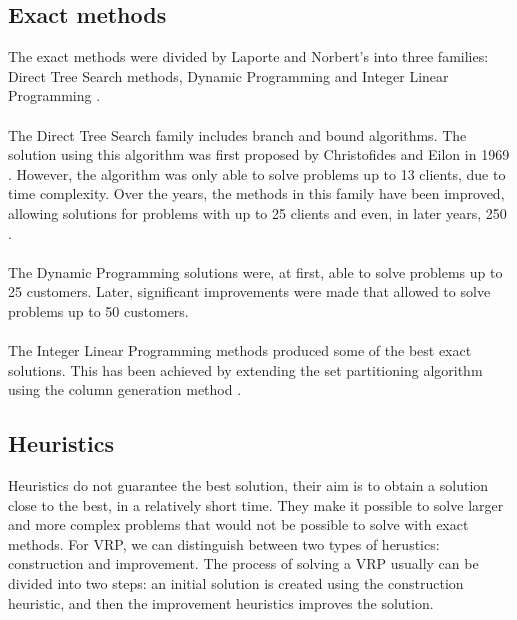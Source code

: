 \documentclass[a4paper,twoside,12pt]{book}
\begin{document}
\subsection{Exact methods}
The exact methods were divided by Laporte and Norbert's into three families: Direct Tree Search methods, Dynamic Programming and Integer Linear Programming \cite{bib:chapter:ExactMethods}.
\paragraph{}
The Direct Tree Search family includes branch and bound algorithms. The solution using this algorithm was first proposed by Christofides and Eilon in 1969 \cite{bib:article:Eilon}. However, the algorithm was only able to solve problems up to 13 clients, due to time complexity. Over the years, the methods in this family have been improved, allowing solutions for problems with up to 25 \cite{bib:article:LowerBound} clients and even, in later years, 250 \cite{bib:article:Laporte}.
\paragraph{}
The Dynamic Programming solutions were, at first, able to solve problems up to 25 customers. Later, significant improvements were made that allowed to solve problems up to 50 customers.
\paragraph{}
The Integer Linear Programming methods produced some of the best exact solutions. This has been achieved by extending the set partitioning algorithm using the column generation method \cite{bib:article:ILP}. 

\subsection{Heuristics}
Heuristics do not guarantee the best solution, their aim is to obtain a solution close to the best, in a relatively short time. They make it possible to solve larger and more complex problems that would not be possible to solve with exact methods. For VRP, we can distinguish between two types of herustics: construction and improvement. The process of solving a VRP usually can be divided into two steps: an initial solution is created using the construction heuristic, and then the improvement heuristics improves the solution. 
\end{document}
